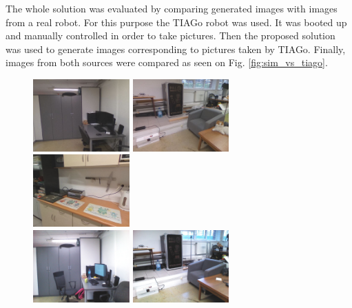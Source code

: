 \documentclass{svproc}
\begin{document}
The whole solution was evaluated by comparing generated images with images from a real robot.
For this purpose the TIAGo robot was used.
It was booted up and manually controlled in order to take pictures.
Then the proposed solution was used to generate images corresponding to pictures taken by TIAGo.
Finally, images from both sources were compared as seen on Fig. \ref{fig:sim_vs_tiago}.

\begin{figure}[!ht]
    \centering
    \includegraphics[width=0.33\textwidth]{img/sim_vs_tiago/sim_biurko.jpg}\hfill%
    \includegraphics[width=0.33\textwidth]{img/sim_vs_tiago/sim_fotel.jpg}\hfill%
    \includegraphics[width=0.33\textwidth]{img/sim_vs_tiago/sim_kuchnia_blat.jpg}\\
    \includegraphics[width=0.33\textwidth]{img/sim_vs_tiago/tia_biurko.jpg}\hfill%
    \includegraphics[width=0.33\textwidth]{img/sim_vs_tiago/tia_fotel.jpg}\hfill%

\end{figure}
\end{document}
